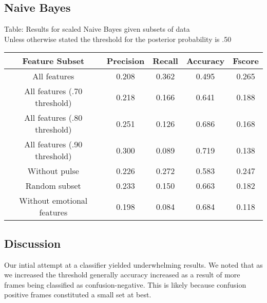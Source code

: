 \documentclass[12pt,letterpaper]{article}
\begin{document}
\subsection{Naive Bayes}
\begin{center} Table: Results for scaled Naive Bayes given subsets of data \\
Unless otherwise stated the threshold for the posterior probability is .50

\begin{tabular}{ c | c | c | c | c }
Feature Subset & Precision & Recall & Accuracy & Fscore\\ \hline
All features & 0.208 & 0.362 & 0.495 & 0.265 \\ \hline
All features (.70 threshold) & 0.218 & 0.166 & 0.641 & 0.188 \\ \hline
All features (.80 threshold) & 0.251 & 0.126 & 0.686 & 0.168 \\ \hline
All features (.90 threshold) & 0.300 & 0.089 & 0.719 & 0.138 \\ \hline
Without pulse & 0.226 & 0.272 & 0.583 & 0.247 \\ \hline
Random subset & 0.233 & 0.150 & 0.663 & 0.182 \\ \hline
Without emotional features & 0.198 & 0.084 & 0.684 & 0.118 \\ \hline
\end{tabular}

\end{center}

\subsection{Discussion}
Our intial attempt at a classifier yielded underwhelming results.  We noted that as we increased the threshold generally accuracy increased as a result of more frames being classified as confusion-negative.  This is likely because confusion positive frames constituted a small set at best.
\end{document}
